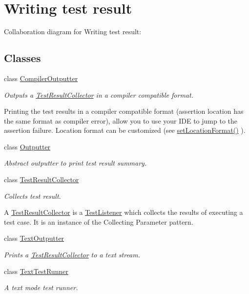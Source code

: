 \hypertarget{group___writing_test_result}{\section{Writing test result}
\label{group___writing_test_result}
}
Collaboration diagram for Writing test result\+:
\subsection*{Classes}
\begin{DoxyCompactItemize}
\item 
class \hyperlink{class_compiler_outputter}{Compiler\+Outputter}
\begin{DoxyCompactList}\small\item\em Outputs a \hyperlink{class_test_result_collector}{Test\+Result\+Collector} in a compiler compatible format.

Printing the test results in a compiler compatible format (assertion location has the same format as compiler error), allow you to use your I\+D\+E to jump to the assertion failure. Location format can be customized (see \hyperlink{class_compiler_outputter_a0d9e67c7bdcb443b0b2754d61a10790c}{set\+Location\+Format()} ). \end{DoxyCompactList}\item 
class \hyperlink{class_outputter}{Outputter}
\begin{DoxyCompactList}\small\item\em Abstract outputter to print test result summary. \end{DoxyCompactList}\item 
class \hyperlink{class_test_result_collector}{Test\+Result\+Collector}
\begin{DoxyCompactList}\small\item\em Collects test result.

A \hyperlink{class_test_result_collector}{Test\+Result\+Collector} is a \hyperlink{class_test_listener}{Test\+Listener} which collects the results of executing a test case. It is an instance of the Collecting Parameter pattern. \end{DoxyCompactList}\item 
class \hyperlink{class_text_outputter}{Text\+Outputter}
\begin{DoxyCompactList}\small\item\em Prints a \hyperlink{class_test_result_collector}{Test\+Result\+Collector} to a text stream. \end{DoxyCompactList}\item 
class \hyperlink{class_text_test_runner}{Text\+Test\+Runner}
\begin{DoxyCompactList}\small\item\em A text mode test runner.


\end{DoxyCompactList}
\end{DoxyCompactItemize}
